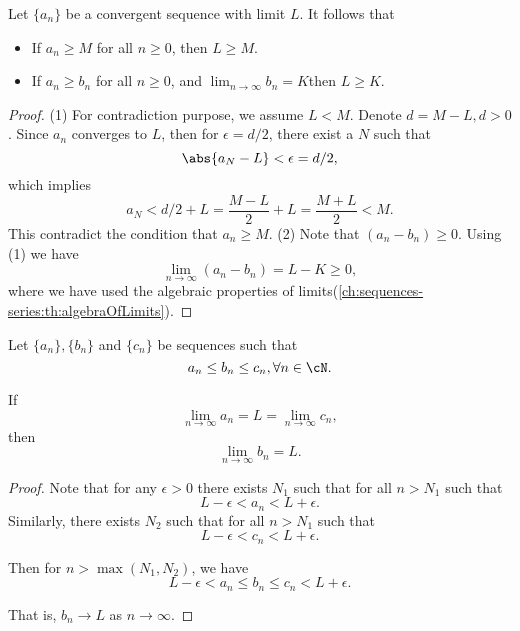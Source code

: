 \begin{refsection}
\begin{lemma}\cite[47]{johnsonbaugh2010foundations}\label{ch:sequences-series:th:SequenceLimitInequality} Let $\{a_n\}$ be a convergent sequence with limit $L$. It follows that
\begin{itemize}
	\item If $a_n \geq M$ for all $n\geq 0$, then $L\geq M$.
	\item If $a_n \geq b_n$ for all $n\geq 0$, and $\lim_{n\to \infty} b_n = K$then $L\geq K$.
\end{itemize}	
\end{lemma}
\begin{proof}
(1)	For contradiction purpose, we assume $L < M$. Denote $d = M - L, d > 0$. Since $a_n$ converges to $L$, then for $\epsilon = d/2$, there exist a $N$ such that
$$\abs{a_N - L} < \epsilon = d/2,$$
which implies $$a_N < d/2 + L = \frac{M-L}{2} + L = \frac{M+L}{2} < M.$$
This contradict the condition that $a_n \geq M$.
(2) Note that $(a_n - b_n) \geq 0$. Using (1) we have
$$\lim_{n \to \infty} (a_n - b_n) = L - K \geq 0,$$
where we have used the algebraic properties of limits(\autoref{ch:sequences-series:th:algebraOfLimits}).
\end{proof}



\begin{lemma}\cite[47]{johnsonbaugh2010foundations}\label{ch:sequences-series:th:squeezeTheorem}
Let $\{a_n\},\{b_n\}$ and $\{c_n\}$ be sequences such that 
$$a_n\leq b_n\leq c_n, \forall n\in\cN.$$
	
If
$$\lim_{n\to\infty } a_n = L = \lim_{n\to \infty} c_n,$$
then
$$\lim_{n\to \infty} b_n = L.$$	
\end{lemma}
\begin{proof}
Note that for any $\epsilon > 0$ there exists $N_1$ such that for all $n > N_1$ such that
$$L-\epsilon < a_n < L + \epsilon.$$
Similarly, there exists $N_2$ such that for all $n > N_1$ such that
$$L-\epsilon < c_n < L + \epsilon.$$
	
Then for $n > \max(N_1,N_2)$, we have
	$$L-\epsilon < a_n \leq b_n \leq c_n < L + \epsilon.$$

That is, $b_n \to L$ as $n\to \infty.$	
\end{proof}




\end{refsection}
